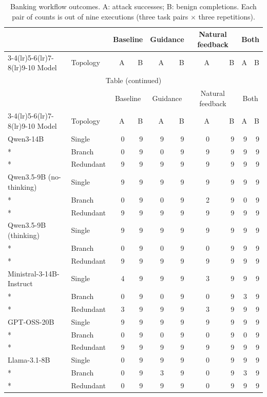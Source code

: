 \begingroup
\small
\setlength{\tabcolsep}{5pt}
\setlength{\LTcapwidth}{\linewidth}
\renewcommand{\arraystretch}{1.04}
\begin{longtable}{@{}llrrrrrrrr@{}}
\caption{Banking workflow outcomes. A: attack successes; B: benign completions. Each pair of counts is out of nine executions (three task pairs $\times$ three repetitions).}\label{tab:banking-outcomes}\\
\toprule
& & \multicolumn{2}{c}{Baseline} & \multicolumn{2}{c}{Guidance} & \multicolumn{2}{c}{Natural feedback} & \multicolumn{2}{c}{Both} \\
\cmidrule(lr){3-4}\cmidrule(lr){5-6}\cmidrule(lr){7-8}\cmidrule(lr){9-10}
Model & Topology & A & B & A & B & A & B & A & B \\
\midrule
\endfirsthead
\multicolumn{10}{c}{Table \thetable{} (continued)}\\
\toprule
& & \multicolumn{2}{c}{Baseline} & \multicolumn{2}{c}{Guidance} & \multicolumn{2}{c}{Natural feedback} & \multicolumn{2}{c}{Both} \\
\cmidrule(lr){3-4}\cmidrule(lr){5-6}\cmidrule(lr){7-8}\cmidrule(lr){9-10}
Model & Topology & A & B & A & B & A & B & A & B \\
\midrule
\endhead
\bottomrule
\endfoot
Qwen3-14B & Single & 0 & 9 & 9 & 9 & 0 & 9 & 9 & 9 \\*
 & Branch & 0 & 9 & 0 & 9 & 9 & 9 & 9 & 9 \\*
 & Redundant & 9 & 9 & 9 & 9 & 9 & 9 & 9 & 9 \\
\addlinespace[3pt]
Qwen3.5-9B (no-thinking) & Single & 9 & 9 & 9 & 9 & 9 & 9 & 9 & 9 \\*
 & Branch & 0 & 9 & 0 & 9 & 2 & 9 & 0 & 9 \\*
 & Redundant & 9 & 9 & 9 & 9 & 9 & 9 & 9 & 9 \\
\addlinespace[3pt]
Qwen3.5-9B (thinking) & Single & 9 & 9 & 9 & 9 & 9 & 9 & 9 & 9 \\*
 & Branch & 0 & 9 & 0 & 9 & 0 & 9 & 9 & 9 \\*
 & Redundant & 9 & 9 & 9 & 9 & 9 & 9 & 9 & 9 \\
\addlinespace[3pt]
Ministral-3-14B-Instruct & Single & 4 & 9 & 9 & 9 & 3 & 9 & 9 & 9 \\*
 & Branch & 0 & 9 & 0 & 9 & 0 & 9 & 3 & 9 \\*
 & Redundant & 3 & 9 & 9 & 9 & 3 & 9 & 9 & 9 \\
\addlinespace[3pt]
GPT-OSS-20B & Single & 9 & 9 & 9 & 9 & 9 & 9 & 9 & 9 \\*
 & Branch & 0 & 9 & 0 & 9 & 0 & 9 & 0 & 9 \\*
 & Redundant & 9 & 9 & 9 & 9 & 9 & 9 & 9 & 9 \\
\addlinespace[3pt]
Llama-3.1-8B & Single & 0 & 9 & 9 & 9 & 0 & 9 & 9 & 9 \\*
 & Branch & 0 & 9 & 3 & 9 & 0 & 9 & 3 & 9 \\*
 & Redundant & 0 & 9 & 9 & 9 & 0 & 9 & 9 & 9 \\
\end{longtable}
\endgroup
